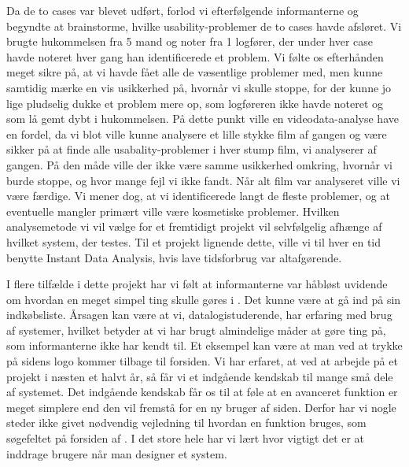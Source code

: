 Da de to cases var blevet udført, forlod vi efterfølgende informanterne og begyndte at brainstorme, hvilke usability-problemer de to cases havde afsløret. Vi brugte hukommelsen fra 5 mand og noter fra 1 logfører, der under hver case havde noteret hver gang han identificerede et problem. Vi følte os efterhånden meget sikre på, at vi havde fået alle de væsentlige problemer med, men kunne samtidig mærke en vis usikkerhed på, hvornår vi skulle stoppe, for der kunne jo lige pludselig dukke et problem mere op, som logføreren ikke havde noteret og som lå gemt dybt i hukommelsen. På dette punkt ville en videodata-analyse have en fordel, da vi blot ville kunne analysere et lille stykke film af gangen og være sikker på at finde alle usabality-problemer i hver stump film, vi analyserer af gangen. På den måde ville der ikke være samme usikkerhed omkring, hvornår vi burde stoppe, og hvor mange fejl vi ikke fandt. Når alt film var analyseret ville vi være færdige. Vi mener dog, at vi identificerede langt de fleste problemer, og at eventuelle mangler primært ville være kosmetiske problemer. Hvilken analysemetode vi vil vælge for et fremtidigt projekt vil selvfølgelig afhænge af hvilket system, der testes. Til et projekt lignende dette, ville vi til hver en tid benytte Instant Data Analysis, hvis lave tidsforbrug var altafgørende.

I flere tilfælde i dette projekt har vi følt at informanterne var håbløst uvidende om hvordan en meget simpel ting skulle gøres i \Foodl. Det kunne \fx være at gå ind på sin indkøbsliste. Årsagen kan være at vi, datalogistuderende, har erfaring med brug af systemer, hvilket betyder at vi har brugt almindelige måder at gøre ting på, som informanterne ikke har kendt til. Et eksempel kan være at man ved at trykke på sidens logo kommer tilbage til forsiden.
Vi har erfaret, at ved at arbejde på et projekt i næsten et halvt år, så får vi et indgående kendskab til mange små dele af systemet. Det indgående kendskab får os til at føle at en avanceret funktion er meget simplere end den vil fremstå for en ny bruger af siden. Derfor har vi nogle steder ikke givet nødvendig vejledning til hvordan en funktion bruges, som \fx søgefeltet på forsiden af \Foodl. I det store hele har vi lært hvor vigtigt det er at inddrage brugere når man designer et system.